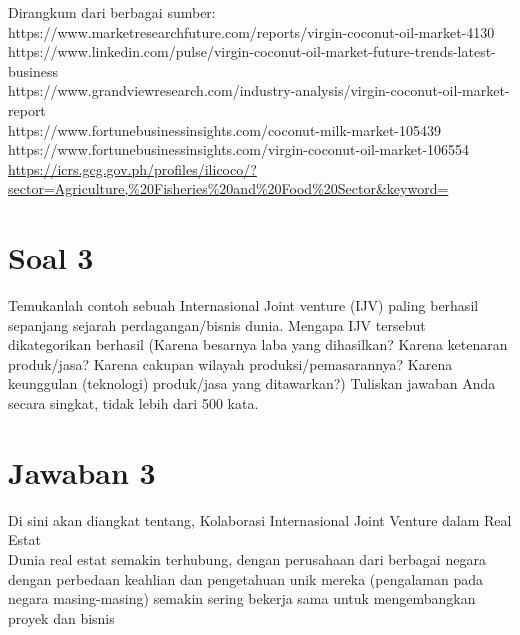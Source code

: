 \documentclass[12pt]{article}
\begin{document}
\noindent
Dirangkum dari berbagai sumber:\\
https://www.marketresearchfuture.com/reports/virgin-coconut-oil-market-4130\\
https://www.linkedin.com/pulse/virgin-coconut-oil-market-future-trends-latest-business\\
https://www.grandviewresearch.com/industry-analysis/virgin-coconut-oil-market-report\\
https://www.fortunebusinessinsights.com/coconut-milk-market-105439\\
https://www.fortunebusinessinsights.com/virgin-coconut-oil-market-106554\\
\url{https://icrs.gcg.gov.ph/profiles/ilicoco/?sector=Agriculture,%20Fisheries%20and%20Food%20Sector&keyword=}


\section*{Soal 3}
Temukanlah contoh sebuah Internasional Joint venture (IJV) paling berhasil sepanjang
sejarah perdagangan/bisnis dunia.
Mengapa IJV tersebut dikategorikan berhasil (Karena besarnya laba yang dihasilkan? Karena
ketenaran produk/jasa? Karena cakupan wilayah produksi/pemasarannya? Karena
keunggulan (teknologi) produk/jasa yang ditawarkan?)
Tuliskan jawaban Anda secara singkat, tidak lebih dari 500 kata.

\section*{Jawaban 3}

Di sini akan diangkat tentang, Kolaborasi Internasional Joint Venture dalam Real Estat\\

Dunia real estat semakin terhubung, dengan perusahaan dari berbagai negara dengan perbedaan keahlian dan pengetahuan unik mereka (pengalaman pada negara masing-masing) semakin sering bekerja sama untuk mengembangkan proyek dan bisnis
\end{document}

